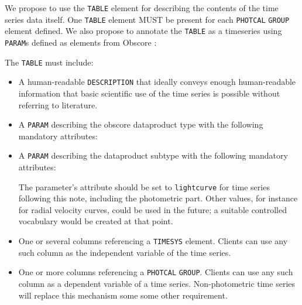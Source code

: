 \documentclass[11pt,a4paper]{ivoa}
\let\fg=\color
\def\attr#1{{\tt{\fg{DarkRed}#1}}}
\def\elem#1{{\tt{\fg{DarkRed}#1}}}
\def\attrval#1#2{{\tt{\fg{DarkRed}#1}="{\fg{DarkPurple}#2}"}}
\begin{document}
We propose to use the \elem{TABLE} element for describing the contents of the time series data itself. One \elem{TABLE} element MUST be present for each \elem{PHOTCAL} \elem{GROUP} element defined. We also propose to annotate the \elem{TABLE} as a timeseries using \elem{PARAM}s defined as elements from Obscore \citep{2017ivoa.spec.0509L}:

The \elem{TABLE} must include:

\begin{itemize}
\item A human-readable \attr{DESCRIPTION} that ideally conveys enough
human-readable information that basic scientific use of the time series
is possible without referring to literature.

\item A \elem{PARAM} describing the obscore dataproduct type with the 
following mandatory attributes:

\item A \elem{PARAM} describing the dataproduct subtype with the
following mandatory attributes:


The parameter's  attribute should be set to
\texttt{lightcurve} for time series following this note, including the
photometric part.  Other values, for instance for radial velocity
curves, could be used in the future; a suitable controlled vocabulary
would be created at that point.

     \item One or several columns referencing a \elem{TIMESYS} element.
     Clients can use any such column as the independent variable of the
     time series.

     \item One or more columns referencing a \texttt{PHOTCAL}
     \elem{GROUP}.  Clients can use any such column as a dependent
     variable of a time series.  Non-photometric time series will
     replace this mechanism some some other requirement.
\end{itemize}
\end{document}
